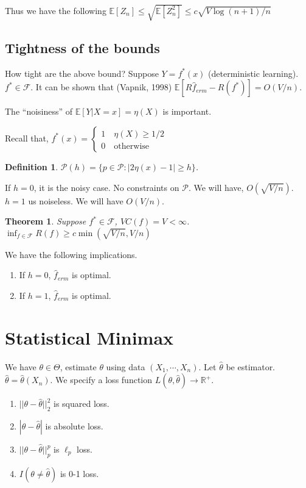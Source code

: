 \documentclass[10pt]{article}
\newcounter{lecnum}
\newtheorem{theorem}{Theorem}[lecnum]
\newtheorem{definition}[def]{Definition}
\renewcommand{\hat}{\widehat}
\begin{document}
 Thus we have the following $\mathbb{E}[Z_n] \le \sqrt{\mathbb{E}[Z_n^2]} \le c \sqrt{V \log(n + 1) / n}$
 
 \subsection{Tightness of the bounds}
 How tight are the above bound? Suppose $Y = f^{*}(x)$ (deterministic learning). $f^{*} \in \mathcal{F}$. It can be shown that (Vapnik, 1998) $\mathbb{E}[R\hat{f}_{erm} - R(f^{*})] = O(V/n)$.
 
 The ``noisiness'' of $\mathbb{E}[Y|X = x] = \eta(X)$ is important.
 
 Recall that, $f^{*}(x) = \begin{cases}
 1 \quad \eta(X) \ge 1/2 \\
  0 \quad \text{otherwise}
 \end{cases}
 $
 
 \begin{definition}
 $\mathcal{P}(h) = \{p \in \mathcal{P} : |2 \eta(x) - 1| \ge h \}$. 
 \end{definition} 

If $h = 0$, it is the noisy case. No constraints on $\mathcal{P}$. We will have, $O(\sqrt{V/n})$. $h = 1$ us noiseless. We will have $O(V/n)$.

\begin{theorem}
	Suppose $f^{*} \in \mathcal{F}$, $VC(f) = V < \infty$. $\inf_{f \in \mathcal{F}} R(f) \ge c \min(\sqrt{V/n}, V/n)$
\end{theorem}

We have the following implications.

\begin{enumerate}
	\item If $h = 0$, $\hat{f}_{erm}$ is optimal.
	\item If $h = 1$, $\hat{f}_{erm}$ is optimal.
\end{enumerate}

\section{Statistical Minimax}

We have $\theta \in \Theta$, estimate $\theta$ using data $(X_1, \cdots , X_n)$. Let $\hat{\theta}$ be estimator. $\hat{\theta} = \hat{\theta}(X_n)$. We specify a loss function $L(\theta, \hat{\theta}) \to \mathbb{R}^{+}$.

\begin{enumerate}
	\item $||\theta - \hat{\theta} ||_{2}^{2}$ is squared loss.
	\item $|\theta - \hat{\theta} |$ is absolute loss.
	\item $||\theta - \hat{\theta} ||_{p}^{p}$ is $\ell_{p}$ loss.
	\item $I(\theta \neq \hat{\theta})$ is 0-1 loss.
\end{enumerate}
\end{document}
